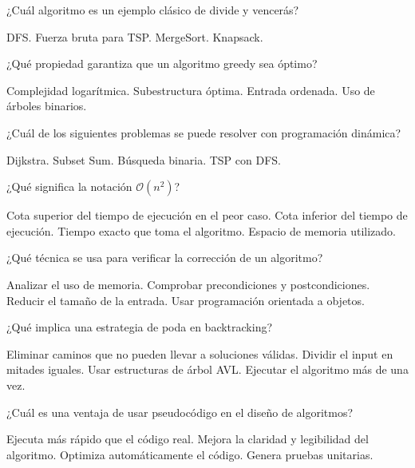 \documentclass[11pt, answers, addpoints]{exam}
\begin{document}
\begin{questions}
\question ¿Cuál algoritmo es un ejemplo clásico de divide y vencerás?
\begin{choices}
\choice DFS.
\choice Fuerza bruta para TSP.
\CorrectChoice MergeSort.
\choice Knapsack.
\end{choices}

\question ¿Qué propiedad garantiza que un algoritmo greedy sea óptimo?
\begin{choices}
\choice Complejidad logarítmica.
\CorrectChoice Subestructura óptima.
\choice Entrada ordenada.
\choice Uso de árboles binarios.
\end{choices}

\question ¿Cuál de los siguientes problemas se puede resolver con programación dinámica?
\begin{choices}
\choice Dijkstra.
\CorrectChoice Subset Sum.
\choice Búsqueda binaria.
\choice TSP con DFS.
\end{choices}

\question ¿Qué significa la notación \(\mathcal{O}(n^2)\)?
\begin{choices}
\CorrectChoice Cota superior del tiempo de ejecución en el peor caso.
\choice Cota inferior del tiempo de ejecución.
\choice Tiempo exacto que toma el algoritmo.
\choice Espacio de memoria utilizado.
\end{choices}

\question ¿Qué técnica se usa para verificar la corrección de un algoritmo?
\begin{choices}
\choice Analizar el uso de memoria.
\CorrectChoice Comprobar precondiciones y postcondiciones.
\choice Reducir el tamaño de la entrada.
\choice Usar programación orientada a objetos.
\end{choices}

\question ¿Qué implica una estrategia de poda en backtracking?
\begin{choices}
\CorrectChoice Eliminar caminos que no pueden llevar a soluciones válidas.
\choice Dividir el input en mitades iguales.
\choice Usar estructuras de árbol AVL.
\choice Ejecutar el algoritmo más de una vez.
\end{choices}

\question ¿Cuál es una ventaja de usar pseudocódigo en el diseño de algoritmos?
\begin{choices}
\choice Ejecuta más rápido que el código real.
\CorrectChoice Mejora la claridad y legibilidad del algoritmo.
\choice Optimiza automáticamente el código.
\choice Genera pruebas unitarias.
\end{choices}


\end{questions}
\end{document}
